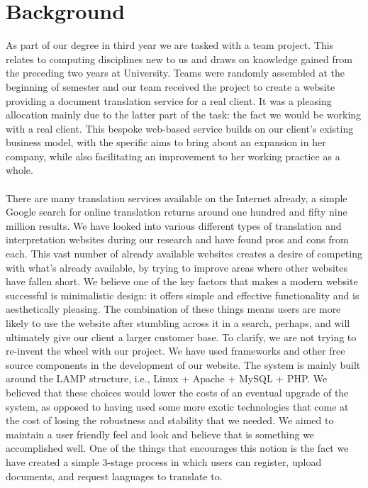 \documentclass{l3proj}
\begin{document}
\section{Background}
As part of our degree in third year we are tasked with a team project. This relates to computing disciplines new to us and draws on knowledge gained from the preceding two years at University. Teams were randomly assembled at the beginning of semester and our team received the project to create a website providing a document translation service for a real client. It was a pleasing allocation mainly due to the latter part of the task: the fact we would be working with a real client. This bespoke web-based service builds on our client's existing business model, with the specific aims to bring about an expansion in her company, while also facilitating an improvement to her working practice as a whole.\\
\\
There are many translation services available on the Internet already, a simple Google search for online translation returns around one hundred and fifty nine million results. We have looked into various different types of translation and interpretation websites during our research and have found pros and cons from each. This vast number of already available websites creates a desire of competing with what's already available, by trying to improve areas where other websites have fallen short. We believe one of the key factors that makes a modern website successful is minimalistic design: it offers simple and effective functionality and is aesthetically pleasing. The combination of these things means users are more likely to use the website after stumbling across it in a search, perhaps, and will ultimately give our client a larger customer base. To clarify, we are not trying to re-invent the wheel with our project. We have used frameworks and other free source components in the development of our website. The system is mainly built around the LAMP structure, i.e., Linux + Apache + MySQL + PHP. We believed that these choices would lower the costs of an eventual upgrade of the system, as opposed to having used some more exotic technologies that come at the cost of losing the robustness and stability that we needed. We aimed to maintain a user friendly feel and look and believe that is something we accomplished well. One of the things that encourages this notion is the fact we have created a simple 3-stage process in which users can register, upload documents, and request languages to translate to.\\ 
\end{document}

